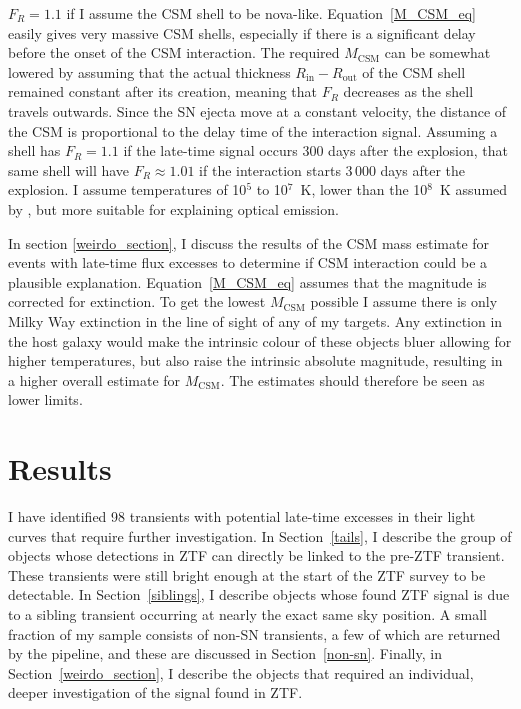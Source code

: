 \documentclass[a4paper,oneside,12pt, class=Latex/Classes/PhDthesisPSnPDF, crop=false]{standalone}
\begin{document}
$F_R=1.1$ if I assume the CSM shell to be nova-like. Equation~\ref{M_CSM_eq} easily gives very massive CSM shells, especially if there is a significant delay before the onset of the CSM interaction. The required $M_\text{CSM}$ can be somewhat lowered by assuming that the actual thickness $R_\text{in} - R_\text{out}$ of the CSM shell remained constant after its creation, meaning that $F_R$ decreases as the shell travels outwards. Since the SN ejecta move at a constant velocity, the distance of the CSM is proportional to the delay time of the interaction signal. Assuming a shell has $F_R = 1.1$ if the late-time signal occurs 300 days after the explosion, that same shell will have $F_R \approx 1.01$ if the interaction starts 3\,000 days after the explosion. I assume temperatures of 10$^5$ to 10$^7$~K, lower than the 10$^8$~K assumed by \cite{2015cp}, but more suitable for explaining optical emission.

In section \ref{weirdo_section}, I discuss the results of the CSM mass estimate for events with late-time flux excesses to determine if CSM interaction could be a plausible explanation. Equation~\ref{M_CSM_eq} assumes that the magnitude is corrected for extinction. To get the lowest $M_\text{CSM}$ possible I assume there is only Milky Way extinction in the line of sight of any of my targets. Any extinction in the host galaxy would make the intrinsic colour of these objects bluer allowing for higher temperatures, but also raise the intrinsic absolute magnitude, resulting in a higher overall estimate for $M_\text{CSM}$. The estimates should therefore be seen as lower limits.


\section{Results}
\label{Pre-ZTF_results}
I have identified 98 transients with potential late-time excesses in their light curves that require further investigation. In Section~\ref{tails}, I describe the group of objects whose detections in ZTF can directly be linked to the pre-ZTF transient. These transients were still bright enough at the start of the ZTF survey to be detectable. In Section~\ref{siblings}, I describe objects whose found ZTF signal is due to a sibling transient occurring at nearly the exact same sky position. A small fraction of my sample consists of non-SN transients, a few of which are returned by the pipeline, and these are discussed in Section~\ref{non-sn}. Finally, in Section~\ref{weirdo_section}, I describe the objects that required an individual, deeper investigation of the signal found in ZTF.
\end{document}
